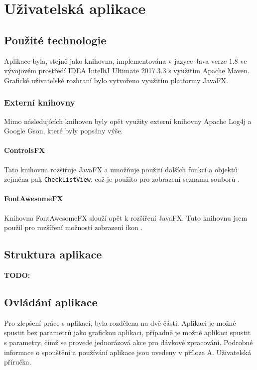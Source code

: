 	\section{Uživatelská aplikace}
	   \subsection{Použité technologie}
	    	 Aplikace byla, stejně jako knihovna, implementována v jazyce Java verze 1.8 ve vývojovém prostředí IDEA IntelliJ Ultimate 2017.3.3 s využitím Apache Maven. Grafické uživatelské rozhraní bylo vytvořeno využitím platformy JavaFX. 
	    	 
	    	 \subsubsection{Externí knihovny}
				Mimo následujících knihoven byly opět využity externí knihovny Apache Log4j a Google Gson, které byly popsány výše.
			
			\paragraph{ControlsFX} 
				Tato knihovna rozšiřuje JavaFX a umožňuje použití dalších funkcí a objektů zejména pak \texttt{CheckListView}, což je použito pro zobrazení seznamu souborů \cite{controlsfx}. 
			
			\paragraph{FontAwesomeFX} 	
				Knihovna FontAwesomeFX slouží opět k rozšíření JavaFX. Tuto knihovnu jsem použil pro rozšíření možností zobrazení ikon \cite{fontawesomefx}.	 
		
		\subsection{Struktura aplikace}
			\textbf{\textcolor{pblue}{TODO: }}\\		
		
	    	   
	   \subsection{Ovládání aplikace}
	   		Pro zlepšení práce s aplikací, byla rozdělena na dvě části. Aplikaci je možné spustit bez parametrů jako grafickou aplikaci, případně je možné aplikaci spustit s parametry, čímž se provede jednorázová akce pro dávkové zpracování. Podrobné informace o spouštění a používání aplikace jsou uvedeny v příloze A. Uživatelská příručka.
	   		

